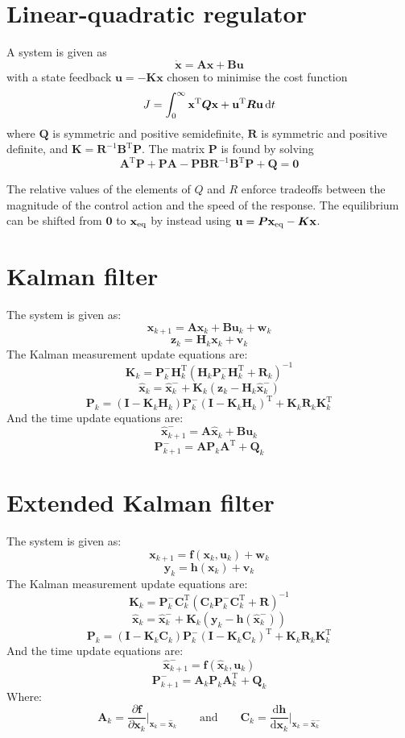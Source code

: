 \documentclass[a4paper]{article}
\newcommand{\M}[1]{\bm{#1}}
\newcommand{\Mc}[1]{\mathbf{#1}}
\newcommand{\V}[1]{\mathbf{#1}}
\newcommand{\transpose}{^{\text{T}}}
\newcommand{\pder}[2]{\frac{\partial#1}{\partial#2}}
\newcommand{\der}[2]{\frac{\text{d}#1}{\text{d}#2}}
\newcommand{\sub}[1]{_{\textnormal{#1}}}
\begin{document}
\section{Linear-quadratic regulator}
A system is given as $$\V{\dot{x}} = \M{A}\V{x} + \M{B}\V{u}$$
with a state feedback $\V{u} = - \M{K}\V{x}$ chosen to minimise the cost function
$$J = \int_0^\infty \V{x}\transpose \M{Q} \V{x} + \V{u}\transpose \M{R} \V{u} \dif t$$
where $\M{Q}$ is symmetric and positive semidefinite, $\M{R}$ is symmetric and positive definite, and $\M{K} = \M{R}^{-1}\M{B}\transpose\M{P}$. The matrix $\M{P}$ is found by solving $$\M{A}\transpose \M{P} + \M{PA} - \M{PBR}^{-1}\M{B}\transpose \M{P} + \M{Q} = \M{0}$$

The relative values of the elements of $Q$ and $R$ enforce tradeoffs between the magnitude of the control action and the speed of the response. The equilibrium can be shifted from $\V{0}$ to $\V{x}\sub{eq}$ by instead using $\V{u} = \M{P}\V{x}\sub{eq} - \M{K}\V{x}$.



\section{Kalman filter}
The system is given as:
$$\V{x}_{k+1} = \M{A}\V{x}_k + \M{B}\V{u}_k + \V{w}_k$$
$$\V{z}_k = \M{H}_k\V{x}_k + \V{v}_k$$
The Kalman measurement update equations are:
$$\M{K}_k = \M{P}_k^- \M{H}_k\transpose (\M{H}_k\M{P}_k^- \M{H}_k\transpose + \M{R}_k)^{-1}$$
$$\V{\hat{x}}_k = \V{\hat{x}}_k^- + \M{K}_k(\V{z}_k - \M{H}_k \V{\hat{x}}_k^-)$$
$$\M{P}_k = (\Mc{I} - \M{K}_k \M{H}_k) \M{P}_k^- (\Mc{I}-\M{K}_k\M{H}_k)\transpose + \M{K}_k\M{R}_k\M{K}_k\transpose$$
And the time update equations are:
$$\V{\hat{x}}_{k+1}^- = \M{A}\V{\hat{x}}_k + \M{B}\V{u}_k$$
$$\M{P}_{k+1}^- = \M{AP}_k\M{A}\transpose + \M{Q}_k$$



\section{Extended Kalman filter}
The system is given as:
$$\V{x}_{k+1} = \V{f}(\V{x}_k, \V{u}_k) + \V{w}_k$$
$$\V{y}_k = \V{h}(\V{x}_k) + \V{v}_k$$
The Kalman measurement update equations are:
$$\M{K}_k = \M{P}_k^- \M{C}_k\transpose (\M{C}_k \M{P}_k^- \M{C}_k\transpose + \M{R})^{-1}$$
$$\V{\hat{x}}_k = \V{\hat{x}}_k^- + \M{K}_k \left(\V{y}_k - \V{h}(\V{\hat{x}}_k^-)\right)$$
$$\M{P}_k = (\Mc{I} - \M{K}_k\M{C}_k) \M{P}_k^- (\Mc{I} - \M{K}_k\M{C}_k)\transpose + \M{K}_k\M{R}_k\M{K}_k\transpose$$
And the time update equations are:
$$\V{\hat{x}}_{k+1}^- = \V{f}(\V{\hat{x}}_k, \V{u}_k)$$
$$\M{P}_{k+1}^- = \M{A}_k\M{P}_k\M{A}_k\transpose + \M{Q}_k$$
Where:
$$\M{A}_k = \pder{\V{f}}{\V{x}_k}\bigg|_{\V{x}_k = \V{\hat{x}}_k} \qquad\text{and}\qquad \M{C}_k = \der{\V{h}}{\V{x}_k}\bigg|_{\V{x}_k = \V{\hat{x}}_k^-}$$
\end{document}
